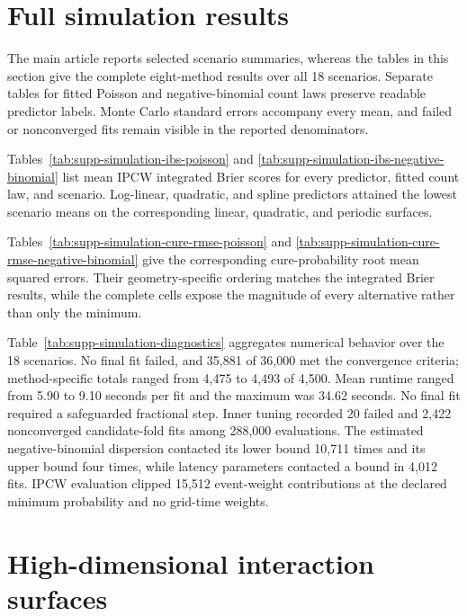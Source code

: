 \documentclass[11pt]{article}
\begin{document}
\section{Full simulation results}\label{sec:supp-simulation-results}

The main article reports selected scenario summaries, whereas the tables in this section give the complete eight-method results over all 18 scenarios. Separate tables for fitted Poisson and negative-binomial count laws preserve readable predictor labels. Monte Carlo standard errors accompany every mean, and failed or nonconverged fits remain visible in the reported denominators.

Tables~\ref{tab:supp-simulation-ibs-poisson} and \ref{tab:supp-simulation-ibs-negative-binomial} list mean IPCW integrated Brier scores for every predictor, fitted count law, and scenario. Log-linear, quadratic, and spline predictors attained the lowest scenario means on the corresponding linear, quadratic, and periodic surfaces.



Tables~\ref{tab:supp-simulation-cure-rmse-poisson} and \ref{tab:supp-simulation-cure-rmse-negative-binomial} give the corresponding cure-probability root mean squared errors. Their geometry-specific ordering matches the integrated Brier results, while the complete cells expose the magnitude of every alternative rather than only the minimum.



Table~\ref{tab:supp-simulation-diagnostics} aggregates numerical behavior over the 18 scenarios. No final fit failed, and 35,881 of 36,000 met the convergence criteria; method-specific totals ranged from 4,475 to 4,493 of 4,500. Mean runtime ranged from 5.90 to 9.10 seconds per fit and the maximum was 34.62 seconds. No final fit required a safeguarded fractional step. Inner tuning recorded 20 failed and 2,422 nonconverged candidate-fold fits among 288,000 evaluations. The estimated negative-binomial dispersion contacted its lower bound 10,711 times and its upper bound four times, while latency parameters contacted a bound in 4,012 fits. IPCW evaluation clipped 15,512 event-weight contributions at the declared minimum probability and no grid-time weights.



\section{High-dimensional interaction surfaces}\label{sec:supp-highdim-simulation}
\end{document}
